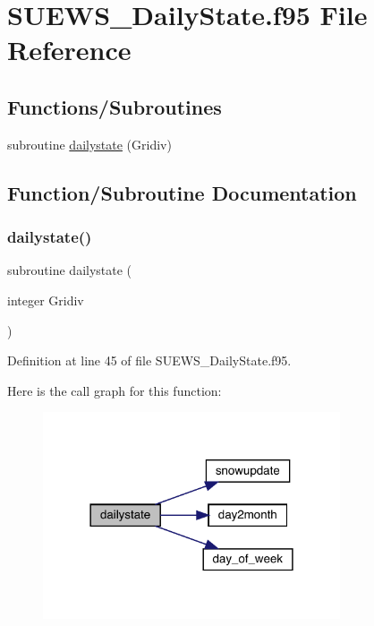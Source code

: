 \hypertarget{_s_u_e_w_s___daily_state_8f95}{}\section{S\+U\+E\+W\+S\+\_\+\+Daily\+State.\+f95 File Reference}
\label{_s_u_e_w_s___daily_state_8f95}
\subsection*{Functions/\+Subroutines}
\begin{DoxyCompactItemize}
\item 
subroutine \hyperlink{_s_u_e_w_s___daily_state_8f95_a29739ac43530dcb073d83e8c57f81778}{dailystate} (Gridiv)
\end{DoxyCompactItemize}


\subsection{Function/\+Subroutine Documentation}
\mbox{\label{_s_u_e_w_s___daily_state_8f95_a29739ac43530dcb073d83e8c57f81778}} 
\subsubsection{\texorpdfstring{dailystate()}{dailystate()}}
{\footnotesize\ttfamily subroutine dailystate (\begin{DoxyParamCaption}\item[{integer}]{Gridiv }\end{DoxyParamCaption})}



Definition at line 45 of file S\+U\+E\+W\+S\+\_\+\+Daily\+State.\+f95.

Here is the call graph for this function\+:\nopagebreak
\begin{figure}[H]
\begin{center}
\leavevmode
\includegraphics[width=249pt]{_s_u_e_w_s___daily_state_8f95_a29739ac43530dcb073d83e8c57f81778_cgraph}
\end{center}
\end{figure}

